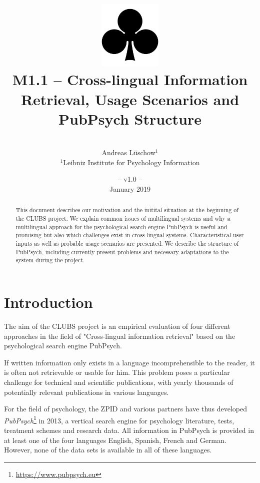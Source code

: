 \documentclass[a4paper,11pt]{article}
\title{
	\includegraphics[width=3cm]{./img/200px-SuitClubs.png} \\
	\Huge M1.1 -- Cross-lingual Information Retrieval, Usage Scenarios and PubPsych Structure\\ 
}
\author{\vspace*{1cm}\\ \LARGE Andreas Lüschow$^{1}$ \medskip \\ 
	\Large $^{1}$Leibniz Institute for Psychology Information}
\date{\vspace*{2cm} -- v1.0 --\\January 2019}
\begin{document}
\clearpage\maketitle
\thispagestyle{empty}

\vspace*{5cm}
\begin{abstract}
This document describes our motivation and the initital situation at the beginning of the CLUBS project. We explain common issues of multilingual systems and why a multilingual approach for the psychological search engine PubPsych is useful and promising but also which challenges exist in cross-lingual systems. Characteristical user inputs as well as probable usage scenarios are presented. We describe the structure of PubPsych, including currently present problems and necessary adaptations to the system during the project. 
\end{abstract}

\newpage
\tableofcontents
\clearpage


\section{Introduction}
\label{s:intro}

The aim of the CLUBS project is an empirical evaluation of four different approaches in the field of "Cross-lingual information retrieval" based on the psychological search engine PubPsych.

If written information only exists in a language incomprehensible to the reader, it is often not retrievable or usable for him. This problem poses a particular challenge for technical and scientific publications, with yearly thousands of potentially relevant publications in various languages. %

For the field of psychology, the ZPID and various partners have thus developed \textit{PubPsych}\footnote{\url{https://www.pubpsych.eu}} in 2013, a vertical search engine for psychology literature, tests, treatment schemes and research data. All information in PubPsych is provided in at least one of the four languages English, Spanish, French and German. However, none of the data sets is available in all of these languages.
\end{document}
